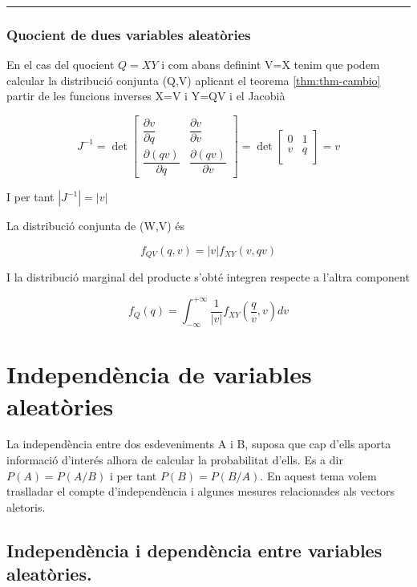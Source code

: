 \documentclass[
  catalan,
]{article}
\theoremstyle{definition}
\theoremstyle{definition}
\theoremstyle{definition}
\theoremstyle{definition}
\theoremstyle{remark}
\begin{document}
\begin{center}\rule{0.5\linewidth}{0.5pt}\end{center}

\subsubsection{Quocient de dues variables aleatòries}\label{quocient-de-dues-variables-aleatuxf2ries}

En el cas del quocient \(Q=XY\) i com abans definint V=X tenim que podem calcular la distribució conjunta (Q,V) aplicant el teorema \ref{thm:thm-cambio} partir de les funcions inverses X=V i Y=QV i el Jacobià

\[
J^{-1}= 
\det
\begin{bmatrix}
\dfrac{\partial v}{\partial q} &
\dfrac{\partial v}{\partial v} \\[1ex]
\dfrac{\partial (qv)}{\partial q} &
\dfrac{\partial (qv)}{\partial v}
\end{bmatrix} =
\det
\begin{bmatrix}
0 & 1 \\
v & q \\
\end{bmatrix} 
=v
\]

I per tant \(|J^{-1}|=|v|\)

La distribució conjunta de (W,V) és

\[
f_{QV}(q,v)=|v| f_{XY} (v,qv)
\]

I la distribució marginal del producte s'obté integren respecte a l'altra component

\[
f_{Q}(q)= \int_{- \infty}^{+ \infty} \dfrac{1}{|v|}f_{XY}(\dfrac{q}{v},v)dv
\]

\newpage

\section{Independència de variables aleatòries}\label{independuxe8ncia-de-variables-aleatuxf2ries}

La independència entre dos esdeveniments A i B, suposa que cap d'ells aporta informació d'interés alhora de calcular la probabilitat d'ells. Es a dir \(P(A)=P(A/B)\) i per tant \(P(B)=P(B/A)\). En aquest tema volem traslladar el compte d'independència i algunes mesures relacionades als vectors aletoris.

\subsection{Independència i dependència entre variables aleatòries.}\label{independuxe8ncia-i-dependuxe8ncia-entre-variables-aleatuxf2ries.}
\end{document}
